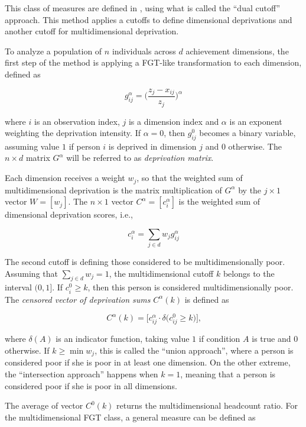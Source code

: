 \documentclass[]{book}
\begin{document}
This class of measures are defined in \citep{alkire2011}, using what is
called the ``dual cutoff'' approach. This method applies a cutoffs to
define dimensional deprivations and another cutoff for multidimensional
deprivation.

To analyze a population of \(n\) individuals across \(d\) achievement
dimensions, the first step of the method is applying a FGT-like
transformation to each dimension, defined as

\[
g_{ij}^\alpha = \bigg( \frac{ z_j - x_{ij} }{ z_j } \bigg)^{\alpha}
\]

where \(i\) is an observation index, \(j\) is a dimension index and
\(\alpha\) is an exponent weighting the deprivation intensity. If
\(\alpha=0\), then \(g_{ij}^0\) becomes a binary variable, assuming
value \(1\) if person \(i\) is deprived in dimension \(j\) and \(0\)
otherwise. The \(n \times d\) matrix \(G^\alpha\) will be referred to as
\emph{deprivation matrix}.

Each dimension receives a weight \(w_j\), so that the weighted sum of
multidimensional deprivation is the matrix multiplication of
\(G^\alpha\) by the \(j \times 1\) vector \(W = [w_j]\). The
\(n \times 1\) vector \(C^\alpha = [c^\alpha_i]\) is the weighted sum of
dimensional deprivation scores, i.e.,

\[
c^\alpha_{i} = \sum_{j \in d} w_j g_{ij}^\alpha
\]

The second cutoff is defining those considered to be multidimensionally
poor. Assuming that \(\sum_{j \in d} w_j = 1\), the multidimensional
cutoff \(k\) belongs to the interval \((0,1]\). If
\(c^0_{i} \geqslant k\), then this person is considered
multidimensionally poor. The \emph{censored vector of deprivation sums}
\(C^\alpha(k)\) is defined as

\[
C^\alpha (k) = \bigg[ c_{ij}^\alpha \cdot \delta \big( c_{ij}^0 \geqslant k \big) \bigg] \text{,}
\]

where \(\delta(A)\) is an indicator function, taking value \(1\) if
condition \(A\) is true and \(0\) otherwise. If
\(k \geqslant \min{ w_j }\), this is called the ``union approach'',
where a person is considered poor if she is poor in at least one
dimension. On the other extreme, the ``intersection approach'' happens
when \(k = 1\), meaning that a person is considered poor if she is poor
in all dimensions.

The average of vector \(C^0 (k)\) returns the multidimensional headcount
ratio. For the multidimensional FGT class, a general measure can be
defined as
\end{document}
